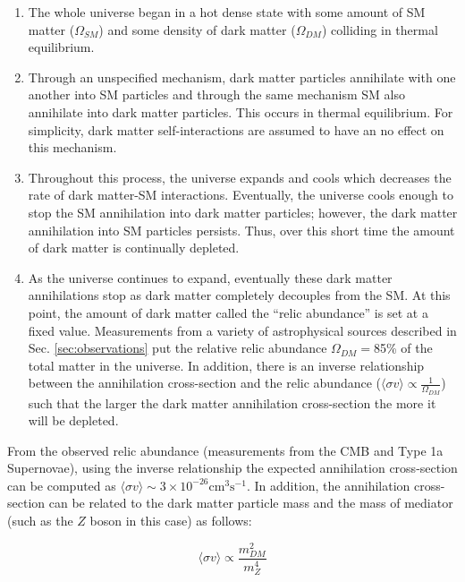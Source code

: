 
\begin{enumerate}
  \item The whole universe began in a hot dense state with some amount of SM matter ($\Omega_{SM}$) and some density of dark matter ($\Omega_{DM}$) colliding in thermal equilibrium.
  \item Through an unspecified mechanism, dark matter particles annihilate with one another into SM particles and through the same mechanism SM also annihilate into dark matter particles. This occurs in thermal equilibrium. For simplicity, dark matter self-interactions are assumed to have an no effect on this mechanism.
  \item Throughout this process, the universe expands and cools which decreases the rate of dark matter-SM interactions. Eventually, the universe cools enough to stop the SM annihilation into dark matter particles; however, the dark matter annihilation into SM particles persists. Thus, over this short time the amount of dark matter is continually depleted.
  \item As the universe continues to expand, eventually these dark matter annihilations stop as dark matter completely decouples from the SM. At this point, the amount of dark matter called the ``relic abundance'' is set at a fixed value. Measurements from a variety of astrophysical sources described in Sec. \ref{sec:observations} put the relative relic abundance $\Omega_{DM}=$85\% of the total matter in the universe. In addition, there is an inverse relationship between the annihilation cross-section and the relic abundance ($ \langle \sigma v \rangle \propto \frac{1}{\Omega_{DM}}$) such that the larger the dark matter annihilation cross-section the more it will be depleted.
\end{enumerate}

From the observed relic abundance (measurements from the CMB and Type 1a Supernovae), using the inverse relationship the expected annihilation cross-section can be computed as $\langle \sigma v \rangle \sim 3 \times 10^{-26}\mathrm{cm}^3 \mathrm{s}^{-1}$. In addition, the annihilation cross-section can be related to the dark matter particle mass and the mass of mediator (such as the $Z$ boson in this case) as follows:

\begin{equation}
    \langle \sigma v \rangle \propto \frac{m_{DM}^2}{m_Z^4}
    \label{eqn:dmcs}
\end{equation}


